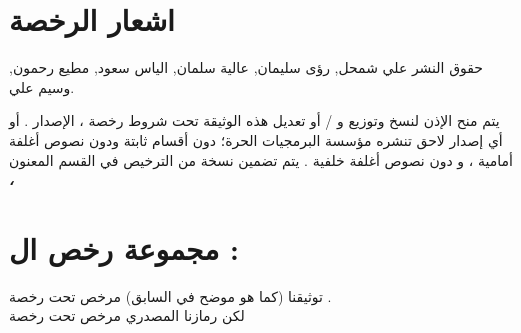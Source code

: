 \documentclass[11pt,a4paper]{report}
\begin{document}
\section{اشعار الرخصة}
\begin{otherlanguage}{arabic}
\begin{center}
حقوق النشر  علي شمحل, رؤى سليمان, عالية سلمان, الياس سعود, مطيع رحمون, وسيم علي.
\end{center}

\begin{center}
يتم منح الإذن لنسخ وتوزيع و / أو تعديل هذه الوثيقة
تحت شروط رخصة \textit{\textbf{ }}، الإصدار  .
أو أي إصدار لاحق تنشره مؤسسة البرمجيات الحرة؛ دون أقسام ثابتة ودون نصوص أغلفة أمامية ، و دون نصوص أغلفة خلفية .
يتم تضمين نسخة من الترخيص في القسم المعنون \textit{\textbf{ ،} } 
\end{center}
\section{مجموعة رخص ال  :}
\begin{otherlanguage}{arabic}
\begin{center}
توثيقنا (كما هو موضح في السابق) مرخص تحت رخصة \textit{} .
\\
لكن رمازنا المصدري مرخص تحت رخصة
\\
 \textit{}











\end{center}
\end{otherlanguage}

\end{otherlanguage}
\end{document}
